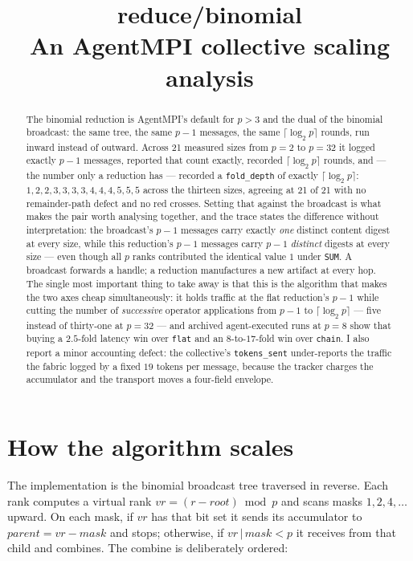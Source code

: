 \documentclass[11pt]{article}
\title{\textbf{reduce/binomial}\\[2pt]\large An AgentMPI collective scaling analysis}
\author{}
\date{}
\begin{document}
\maketitle

\begin{abstract}
The binomial reduction is AgentMPI's default for $p>3$ and the dual of the binomial broadcast:
the same tree, the same $p-1$ messages, the same $\lceil\log_2 p\rceil$ rounds, run inward
instead of outward. Across 21 measured sizes from $p=2$ to $p=32$ it logged exactly $p-1$
messages, reported that count exactly, recorded $\lceil\log_2 p\rceil$ rounds, and --- the
number only a reduction has --- recorded a \texttt{fold\_depth} of exactly
$\lceil\log_2 p\rceil$: $1, 2, 2, 3, 3, 3, 3, 4, 4, 4, 5, 5, 5$ across the thirteen sizes,
agreeing at 21 of 21 with no remainder-path defect and no red crosses. Setting that against
the broadcast is what makes the pair worth analysing together, and the trace states the
difference without interpretation: the broadcast's $p-1$ messages carry exactly \emph{one}
distinct content digest at every size, while this reduction's $p-1$ messages carry $p-1$
\emph{distinct} digests at every size --- even though all $p$ ranks contributed the identical
value $1$ under \texttt{SUM}. A broadcast forwards a handle; a reduction manufactures a new
artifact at every hop. The single most important thing to take away is that this is the
algorithm that makes the two axes cheap simultaneously: it holds traffic at the flat
reduction's $p-1$ while cutting the number of \emph{successive} operator applications from
$p-1$ to $\lceil\log_2 p\rceil$ --- five instead of thirty-one at $p=32$ --- and archived
agent-executed runs at $p=8$ show that buying a $2.5$-fold latency win over \texttt{flat} and
an $8$-to-$17$-fold win over \texttt{chain}. I also report a minor accounting defect: the
collective's \texttt{tokens\_sent} under-reports the traffic the fabric logged by a fixed
$19$ tokens per message, because the tracker charges the accumulator and the transport moves a
four-field envelope.
\end{abstract}



\section{How the algorithm scales}

The implementation is the binomial broadcast tree traversed in reverse. Each rank computes a
virtual rank $vr = (r - \mathit{root}) \bmod p$ and scans masks $1, 2, 4, \dots$ upward. On
each mask, if $vr$ has that bit set it sends its accumulator to
$\mathit{parent} = vr - \mathit{mask}$ and stops; otherwise, if $vr\,|\,\mathit{mask} < p$ it
receives from that child and combines. The combine is deliberately ordered:
\end{document}
